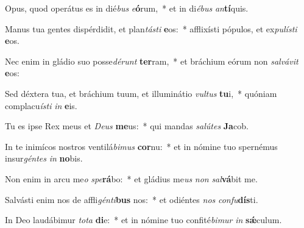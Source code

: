 \item Opus, quod operátus es in dié\textit{bus} \textit{e}\textbf{ó}rum,~* et in di\textit{é}\textit{bus} \textit{an}\textbf{tí}quis.
\item Manus tua gentes dispérdidit, et plan\textit{tás}\textit{ti} \textbf{e}os:~* afflixísti pópulos, et ex\textit{pu}\textit{lís}\textit{ti} \textbf{e}os.
\item Nec enim in gládio suo posse\textit{dé}\textit{runt} \textbf{ter}ram,~* et bráchium eórum non \textit{sal}\textit{vá}\textit{vit} \textbf{e}os:
\item Sed déxtera tua, et bráchium tuum, et illuminátio \textit{vul}\textit{tus} \textbf{tu}i,~* quóniam complacu\textit{ís}\textit{ti} \textit{in} \textbf{e}is.
\item Tu es ipse Rex meus et \textit{De}\textit{us} \textbf{me}us:~* qui mandas \textit{sa}\textit{lú}\textit{tes} \textbf{Ja}cob.
\item In te inimícos nostros ventilá\textit{bi}\textit{mus} \textbf{cor}nu:~* et in nómine tuo spernémus insur\textit{gén}\textit{tes} \textit{in} \textbf{no}bis.
\item Non enim in arcu me\textit{o} \textit{spe}\textbf{rá}bo:~* et gládius me\textit{us} \textit{non} \textit{sal}\textbf{vá}bit me.
\item Salvásti enim nos de affli\textit{gén}\textit{ti}\textbf{bus} nos:~* et odiéntes \textit{nos} \textit{con}\textit{fu}\textbf{dís}ti.
\item In Deo laudábimur \textit{to}\textit{ta} \textbf{di}e:~* et in nómine tuo confité\textit{bi}\textit{mur} \textit{in} \textbf{sǽ}culum.
